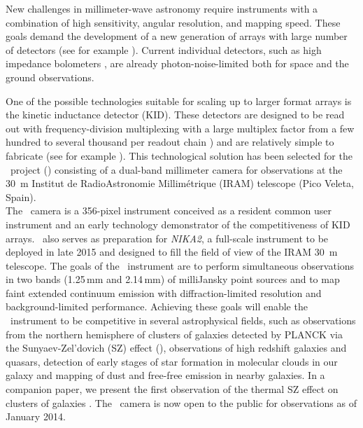 
New challenges in millimeter-wave astronomy require instruments with a combination of high sensitivity, angular resolution, and mapping speed.  These goals demand 
the development of   a new generation of arrays with large number of 
detectors (see for example \cite{2010SPIE.7741E...2B, gismo, 2008ACT, 2008SPIE.7020E..25G}). Current individual detectors, such as high
impedance bolometers \citep{2012MmSAI..83...72T}, are already photon-noise-limited both for space and the ground observations. 

One of the possible technologies suitable for scaling up to larger format arrays is the 
kinetic inductance detector (KID). These detectors are designed to be read out with frequency-division 
multiplexing with a large multiplex factor from a few hundred to several thousand per 
readout chain \cite{2012SPIE.8452E..0OB, Swenson2010}) and are relatively simple
to fabricate (see for example \cite{day2003, 2007stt..conf..170D}).
This technological solution has been selected
for the \NIKA\ project (\cite{NIKA_2010, NIKA_2011}) consisting of
a dual-band millimeter camera for observations at the 30~m Institut de RadioAstronomie Millim\'etrique (IRAM) telescope (Pico Veleta, Spain).
\\ 
The \NIKA\ camera is a 356-pixel instrument
conceived as a resident common user instrument and 
an early technology demonstrator of the competitiveness of KID arrays. \NIKA\ also serves
as preparation for \textit{NIKA2}, a full-scale instrument to be deployed in late 2015 and 
designed to fill the field of view of the IRAM 30~m telescope. 
The goals of the \NIKA\ instrument are to perform simultaneous observations in two bands (1.25\,mm and
2.14\,mm) of milliJansky point sources and to map faint extended
continuum emission with diffraction-limited
resolution and background-limited performance. Achieving these goals 
will enable the \NIKA\ instrument to be competitive in several
astrophysical fields, such as observations from the northern hemisphere of clusters of galaxies detected by PLANCK via the Sunyaev-Zel'dovich (SZ) effect (\cite{2013A&A...550A.128P}), observations of high redshift
galaxies and quasars, detection of early stages of star formation in molecular clouds in our galaxy 
and mapping of dust and free-free emission in nearby galaxies.  In a companion paper, we present the first observation of the thermal SZ effect on
clusters of galaxies \citep{2013arXiv1310.6237A}.  The \NIKA\ camera is now open to the public for observations as of January 2014.

